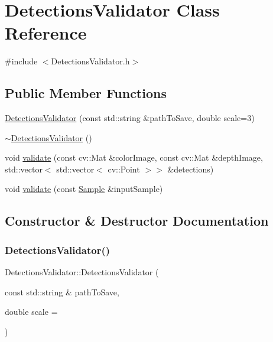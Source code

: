 \hypertarget{class_detections_validator}{}\section{Detections\+Validator Class Reference}
\label{class_detections_validator}


{\ttfamily \#include $<$Detections\+Validator.\+h$>$}

\subsection*{Public Member Functions}
\begin{DoxyCompactItemize}
\item 
\hyperlink{class_detections_validator_a85eb7bc41a47b9672c6dec768fd39ad5}{Detections\+Validator} (const std\+::string \&path\+To\+Save, double scale=3)
\item 
\hyperlink{class_detections_validator_a993e013f8be223822d46d96847d4ff76}{$\sim$\+Detections\+Validator} ()
\item 
void \hyperlink{class_detections_validator_a105c1bda43fee24887005840fccb7576}{validate} (const cv\+::\+Mat \&color\+Image, const cv\+::\+Mat \&depth\+Image, std\+::vector$<$ std\+::vector$<$ cv\+::\+Point $>$$>$ \&detections)
\item 
void \hyperlink{class_detections_validator_a742df9d44127fa19a919e985b7ad6953}{validate} (const \hyperlink{struct_sample}{Sample} \&input\+Sample)
\end{DoxyCompactItemize}


\subsection{Constructor \& Destructor Documentation}
\mbox{\label{class_detections_validator_a85eb7bc41a47b9672c6dec768fd39ad5}} 
\subsubsection{\texorpdfstring{Detections\+Validator()}{DetectionsValidator()}}
{\footnotesize\ttfamily Detections\+Validator\+::\+Detections\+Validator (\begin{DoxyParamCaption}\item[{const std\+::string \&}]{path\+To\+Save,  }\item[{double}]{scale = {} }\end{DoxyParamCaption})}

